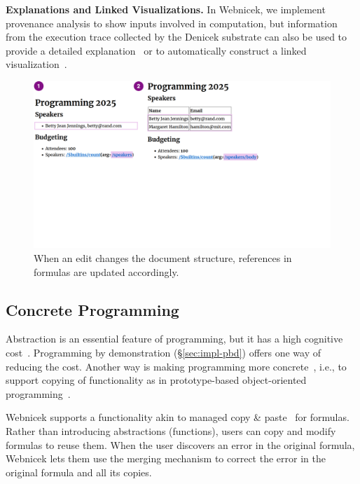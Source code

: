 \documentclass[sigconf]{acmart}
\DeclareRobustCommand{\keyideabox}[3]
{\vspace{\dimexpr\baselineskip\relax} \noindent\colorbox{gray!20}{
\parbox{\dimexpr\columnwidth-\marginparsep+1pt\relax}
{\small {#1} \textbf{#2.} #3}
}}
\begin{document}
\keyideabox{\faBarChart}{Explanations and Linked Visualizations}{In Webnicek, we implement
provenance analysis to show inputs involved in computation, but information from the execution
trace collected by the Denicek substrate can also be used to provide a detailed
explanation~\cite{perera-2012-functional} or to automatically construct
a linked visualization~\cite{perera-2022-linked}.}


\begin{figure}[t]
\includegraphics[width=0.9\columnwidth,clip,trim=0cm 9.5cm 8cm 0cm]{fig/coevolution.pdf}
\caption{When an edit changes the document structure, references in formulas are updated accordingly.}
\label{fig:coevolution}
\end{figure}



\subsection{Concrete Programming}
\label{sec:impl-copy}

Abstraction is an essential feature of programming, but it has a high cognitive
cost~\cite{blackwell-2002-attention}. Programming by demonstration (\S\ref{sec:impl-pbd})
offers one way of reducing the cost. Another way is making programming more
concrete~\cite{edwards-2004-example,smith-1975-pygmalion}, i.e., to support copying of functionality
as in prototype-based object-oriented programming~\cite{ungar-1987-self,randall-1995-self}.

Webnicek supports a functionality akin to managed copy \&
paste~\cite{edwards-2006-copypaste,edwards-2022-copypaste} for formulas. Rather than introducing
abstractions (functions), users can copy and modify formulas to reuse them. When the user
discovers an error in the original formula, Webnicek lets them use the merging mechanism to correct
the error in the original formula and all its copies.
\end{document}
